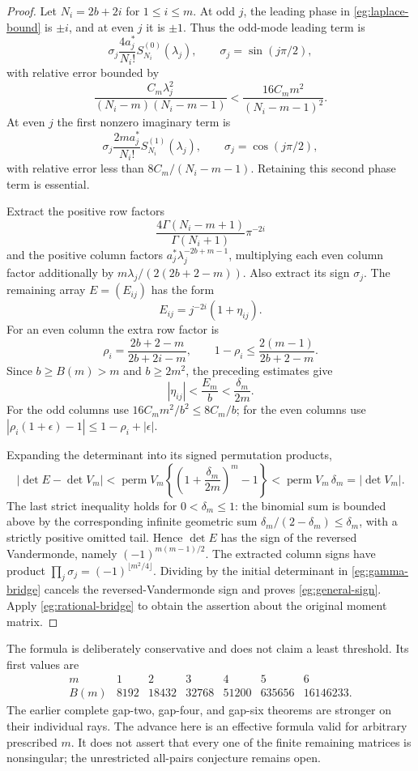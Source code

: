 \documentclass[11pt,a4paper]{article}
\numberwithin{equation}{section}
\theoremstyle{definition}
\theoremstyle{remark}
\begin{document}
\begin{proof}
Let $N_i=2b+2i$ for $1\le i\le m$.  At odd $j$, the leading
phase in \eqref{eg:laplace-bound} is $\pm i$, and at even $j$
it is $\pm1$.  Thus the odd-mode leading term is
\[
 \sigma_j\frac{4a_j^*}{N_i!}S_{N_i}^{(0)}(\lambda_j),
 \qquad \sigma_j=\sin(j\pi/2),
\]
with relative error bounded by
\[
 \frac{C_m\lambda_j^2}{(N_i-m)(N_i-m-1)}
       <\frac{16C_mm^2}{(N_i-m-1)^2}.
\]
At even $j$ the first nonzero imaginary term is
\[
 \sigma_j\frac{2ma_j^*}{N_i!}S_{N_i}^{(1)}(\lambda_j),
 \qquad \sigma_j=\cos(j\pi/2),
\]
with relative error less than $8C_m/(N_i-m-1)$.
Retaining this second phase term is essential.

Extract the positive row factors
\[
 \frac{4\Gamma(N_i-m+1)}{\Gamma(N_i+1)}\pi^{-2i}
\]
and the positive column factors $a_j^*\lambda_j^{-2b+m-1}$,
multiplying each even column factor additionally by
$m\lambda_j/(2(2b+2-m))$.  Also extract its sign $\sigma_j$.
The remaining array $E=(E_{ij})$ has the form
\[
 E_{ij}=j^{-2i}(1+\eta_{ij}).
\]
For an even column the extra row factor is
\[
 \rho_i=\frac{2b+2-m}{2b+2i-m},\qquad
 1-\rho_i\le\frac{2(m-1)}{2b+2-m}.
\]
Since $b\ge B(m)>m$ and $b\ge2m^2$, the preceding estimates give
\begin{equation}\label{eg:eta}
 |\eta_{ij}|<\frac{E_m}{b}<\frac{\delta_m}{2m}.
\end{equation}
For the odd columns use
$16C_mm^2/b^2\le8C_m/b$; for the even columns use
$|\rho_i(1+\epsilon)-1|\le1-\rho_i+|\epsilon|$.

Expanding the determinant into its signed permutation products,
\[
 |\det E-\det V_m|
 <\operatorname{perm}V_m
       \left\{\left(1+\frac{\delta_m}{2m}\right)^m-1\right\}
 <\operatorname{perm}V_m\,\delta_m=|\det V_m|.
\]
The last strict inequality holds for $0<\delta_m\le1$: the binomial
sum is bounded above by the corresponding infinite geometric sum
$\delta_m/(2-\delta_m)\le\delta_m$, with a strictly positive
omitted tail.  Hence $\det E$ has the sign of the reversed
Vandermonde, namely $(-1)^{m(m-1)/2}$.
The extracted column signs have product
$\prod_j\sigma_j=(-1)^{\lfloor m^2/4\rfloor}$.
Dividing by the initial determinant in \eqref{eg:gamma-bridge}
cancels the reversed-Vandermonde sign and proves
\eqref{eg:general-sign}.  Apply \eqref{eg:rational-bridge} to
obtain the assertion about the original moment matrix.
\end{proof}

The formula is deliberately conservative and does not claim a least
threshold.  Its first values are
\[
 \begin{array}{c|rrrrrr}
 m&1&2&3&4&5&6\\ \hline
 B(m)&8192&18432&32768&51200&635656&16146233.
 \end{array}
\]
The earlier complete gap-two, gap-four, and gap-six theorems are
stronger on their individual rays.  The advance here is an effective
formula valid for arbitrary prescribed $m$.  It does not assert
that every one of the finite remaining matrices is nonsingular;
the unrestricted all-pairs conjecture remains open.
\end{document}
